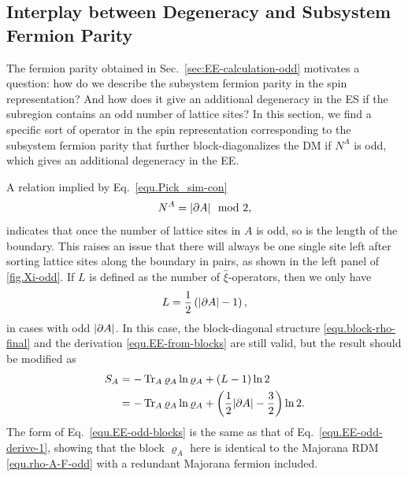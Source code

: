 \subsection{Interplay between Degeneracy and Subsystem Fermion Parity}\label{sec:origin_degeneracy_odd}



The fermion parity obtained in Sec.~\ref{sec:EE-calculation-odd} motivates a question: how do we describe the subsystem fermion parity in the spin representation? And how does it give an additional degeneracy in the ES if the subregion contains an odd number of lattice sites? In this section, we find a specific sort of operator in the spin representation corresponding to the subsystem fermion parity that further block-diagonalizes the DM if $N^A$ is odd, which gives an additional degeneracy in the EE.

A relation implied by Eq.~\eqref{equ.Pick_sim-con} 
\[%
    N^A=\abs{\de A} \mod{2},
\]
indicates that once the number of lattice sites in $A$ is odd, so is the length of the boundary. This raises an issue that there will always be one single site left after sorting lattice sites along the boundary in pairs, as shown in the left panel of \autoref{fig.Xi-odd}. If $L$ is defined as the number of $\hat{\xi}$-operators, then we only have
\[
L = \frac{1}{2}\left( \abs{\partial A} - 1 \right),
\]
in cases with odd $\abs{\partial A}$. In this case, the block-diagonal structure \eqref{equ.block-rho-final} and the derivation \eqref{equ.EE-from-blocks} are still valid, but the result should be modified as
\begin{align}\label{equ.EE-odd-blocks}
    S_A &= -\Tr_A\varrho_A\ln\varrho_A + \left( L-1 \right)\ln 2 \nonumber\\
    &= -\Tr_A\varrho_A\ln\varrho_A + \left( \frac{1}{2}\abs{\partial A}-\frac{3}{2} \right)\ln 2.
\end{align}
The form of Eq.~\eqref{equ.EE-odd-blocks} is the same as that of Eq.~\eqref{equ.EE-odd-derive-1}, showing that the block $\varrho_A$ here is identical to the Majorana RDM \eqref{equ.rho-A-F-odd} with a redundant Majorana fermion included. 

